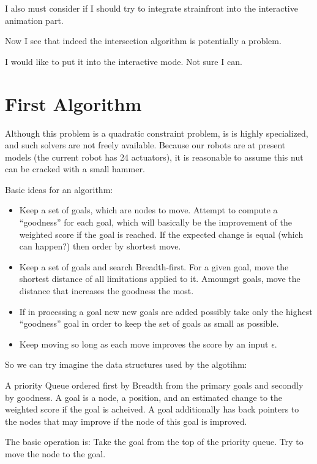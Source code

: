 \documentclass[11pt]{article}
\begin{document}
I also must consider if I should try to integrate strainfront into the interactive animation part.

Now I see that indeed the intersection algorithm is potentially a problem.

I would like to put it into the interactive mode.  Not sure I can.



\section{First Algorithm}

Although this problem is a quadratic constraint problem,
is is highly specialized, and such solvers are not
freely available. Because our robots are at present models
(the current robot has 24 actuators), it is
reasonable to assume this nut can be cracked with a small hammer.

Basic ideas for an algorithm:
\begin{itemize}
\item Keep a set of goals, which are nodes to move.  Attempt to compute a ``goodness''
  for each goal,
  which will basically be the improvement of the weighted score if the goal is reached. If the
  expected change is equal (which can happen?) then order by shortest move.
\item Keep a set of goals and search Breadth-first. For a given goal, move the shortest distance
  of all limitations applied to it.  Amoungst goals, move the distance that increases the goodness
  the most.
\item If in processing a goal new new goals are added possibly
  take only the highest ``goodness'' goal in order
  to keep the set of goals as small as possible.
  \item Keep moving so long as each move improves the score by an input $\epsilon$.
\end{itemize}

So we can try imagine the data structures used by the algotihm:

A priority Queue ordered first by Breadth from the primary goals and secondly by goodness.
A goal is a node, a position, and an estimated change to the weighted score
if the goal is acheived.
A goal additionally has back pointers to the nodes that may improve
if the node of this goal is improved.

The basic operation is:
Take the goal from the top of the priority queue.
Try to move the node to the goal.
\end{document}
